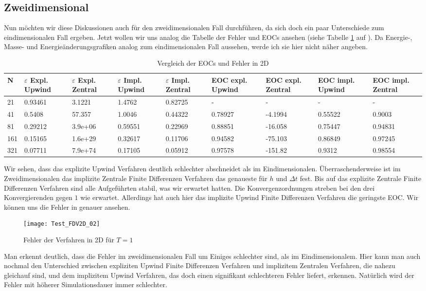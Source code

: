 \documentclass[12pt,a4paper]{scrartcl}
\numberwithin{equation}{section} %
\theoremstyle{definition}
\theoremstyle{plain}
\begin{document}
\subsection{Zweidimensional}
Nun möchten wir diese Diskussionen auch für den zweidimensionalen Fall durchführen, da sich doch ein paar Unterschiede zum eindimensionalen Fall ergeben. Jetzt wollen wir uns analog die Tabelle der Fehler und EOCs ansehen (siehe Tabelle \ref{tab:Vergl2D} auf \pageref{tab:Vergl2D}). Da Energie-, Masse- und Energieänderungsgrafiken analog zum eindimensionalen Fall aussehen, werde ich sie hier nicht näher angeben.
\begin{table}[h]
\caption{Vergleich der EOCs und Fehler in 2D}
\label{tab:Vergl2D}
\begin{tabularx}{\textwidth}{|X|X|X|X|X|X|X|X|X|}
\hline
N&$\varepsilon$ Expl. Upwind&$\varepsilon$ Expl. Zentral&$\varepsilon$ Impl. Upwind&$\varepsilon$ Impl. Zentral& EOC expl. Upwind&EOC expl. Zentral& EOC impl. Upwind& EOC impl. Zentral\\
\hline
21&0.93461&3.1221&1.4762&0.82725 &-&-&-&-\\ 
41&0.5408&57.357&1.0046&0.44322&0.78927& -4.1994&0.55522&0.9003\\
81& 0.29212&3.9e+06&0.59551&0.22969&0.88851& -16.058&0.75447&0.94831 \\ 
161&0.15165&1.6e+29&0.32617&0.11706&0.94582& -75.103&0.86849&0.97245\\ 
321&0.07711&7.9e+74 &0.17105&0.05912&0.97578& -151.82&  0.9312&0.98554  \\\hline
\end{tabularx}
\end{table}
\par Wir sehen, dass das explizite Upwind Verfahren deutlich schlechter abschneidet als im Eindimensionalen. Überraschenderweise ist im Zweidimensionalen das implizite Zentrale Finite Differenzen Verfahren das genaueste für $h$ und $\Delta t$ fest. Bis auf das explizite Zentrale Finite Differenzen Verfahren sind alle Aufgeführten stabil, was wir erwartet hatten. Die Konvergenzordnungen streben bei den drei Konvergierenden gegen $1$ wie erwartet. Allerdings hat auch hier das implizite Upwind Finite Differenzen Verfahren die geringste EOC. Wir können uns die Fehler in  genauer ansehen.
\begin{figure}[h]
\centering
\texttt{[image: Test\_FDV2D\_02]}
\caption{Fehler der Verfahren in 2D für $T=1$}
\label{fig:Fehler2D}
\end{figure}
Man erkennt deutlich, dass die Fehler im zweidimensionalen Fall um Einiges schlechter sind, als im Eindimensionalem. Hier kann man auch nochmal den Unterschied zwischen expliziten Upwind Finite Differenzen Verfahren und implizitem Zentralen Verfahren, die nahezu gleichauf sind, und dem implizitem Upwind Verfahren, das doch einen signifikant schlechteren Fehler liefert, erkennen. Natürlich wird der Fehler mit höherer Simulationsdauer immer schlechter.
\end{document}
